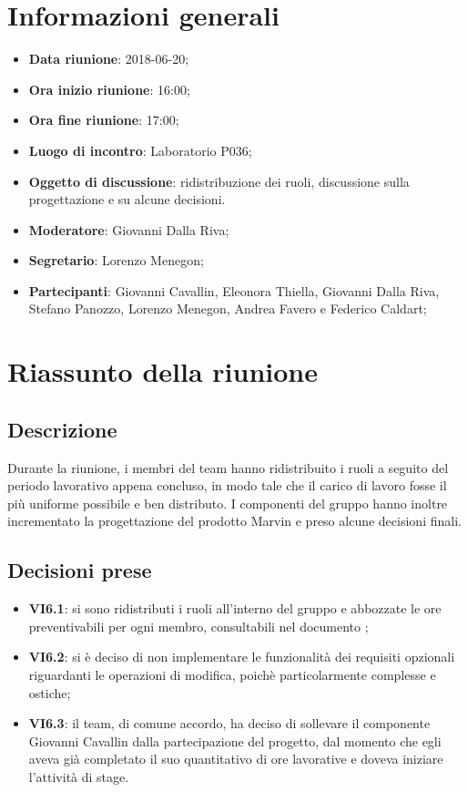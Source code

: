 \section{Informazioni generali}
	\begin{itemize}
		\item \textbf{Data riunione}: 2018-06-20;
		\item \textbf{Ora inizio riunione}: 16:00;
		\item \textbf{Ora fine riunione}: 17:00;
		\item \textbf{Luogo di incontro}: Laboratorio P036;
		\item \textbf{Oggetto di discussione}: ridistribuzione dei ruoli, discussione sulla progettazione e su alcune decisioni.
		\item \textbf{Moderatore}: Giovanni Dalla Riva;
		\item \textbf{Segretario}: Lorenzo Menegon;
		\item \textbf{Partecipanti}: Giovanni Cavallin, Eleonora Thiella, Giovanni Dalla Riva, Stefano Panozzo, Lorenzo Menegon, Andrea Favero e Federico Caldart;
	\end{itemize}

\section{Riassunto della riunione}
	\subsection{Descrizione} Durante la riunione, i membri del team hanno ridistribuito i ruoli a seguito del periodo lavorativo appena concluso, in modo tale che il carico di lavoro fosse il più uniforme possibile e ben distributo. I componenti del gruppo hanno inoltre incrementato la progettazione del prodotto Marvin e preso alcune decisioni finali.
	
	\subsection{Decisioni prese}
		\begin{itemize}
			\item \textbf{VI6.1}: si sono ridistributi i ruoli all'interno del gruppo e abbozzate le ore preventivabili per ogni membro, consultabili nel documento \PdP;
			\item \textbf{VI6.2}: si è deciso di non implementare le funzionalità dei requisiti opzionali riguardanti le operazioni di modifica, poichè particolarmente complesse e ostiche;
			\item \textbf{VI6.3}: il team, di comune accordo, ha deciso di sollevare il componente Giovanni Cavallin dalla partecipazione del progetto, dal momento che egli aveva già completato il suo quantitativo di ore lavorative e doveva iniziare l'attività di stage.
		\end{itemize}

